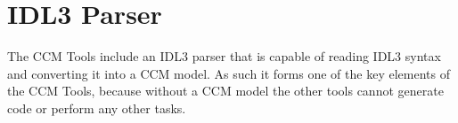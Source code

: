 \chapter{IDL3 Parser}
\label{chapter:idl3-parser}

The CCM Tools include an IDL3 parser that is capable of reading IDL3 syntax and
converting it into a CCM model. As such it forms one of the key elements of the
CCM Tools, because without a CCM model the other tools cannot generate code or
perform any other tasks.

